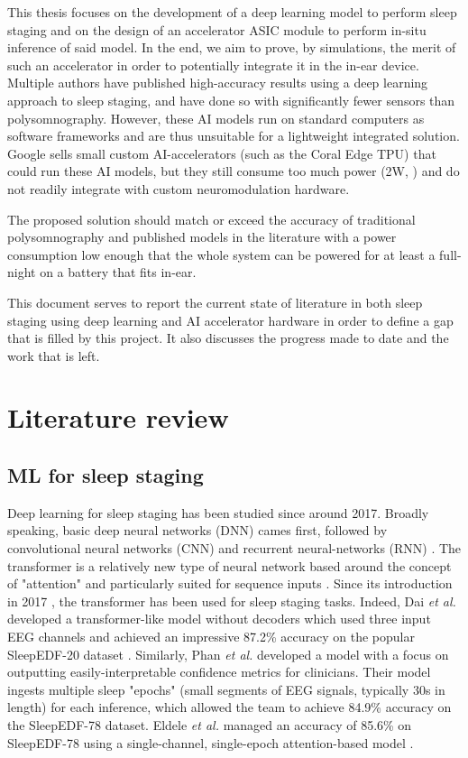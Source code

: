 \documentclass[12pt]{article}
\begin{document}
    This thesis focuses on the development of a deep learning model to perform sleep staging and on the design of an accelerator ASIC module to perform in-situ inference of said model. In the end, we aim to prove, by simulations, the merit of such an accelerator in order to potentially integrate it in the in-ear device.
    Multiple authors \cite{dutt2023sleepxai, fu2021deep, eldele2021attention} have published high-accuracy results using a deep learning approach to sleep staging, and have done so with significantly fewer sensors than polysomnography. However, these AI models run on standard computers as software frameworks and are
    thus unsuitable for a lightweight integrated solution. Google sells small custom AI-accelerators (such as the Coral Edge TPU) that could run these AI models, but they still consume too much power (2W, \cite{coral_datasheet}) and do not readily integrate with custom neuromodulation hardware.

    The proposed solution should match or exceed the accuracy of traditional polysomnography and published models in the literature with a power consumption low enough that the whole system can be powered for at least a full-night on a battery that fits in-ear.

    This document serves to report the current state of literature in both sleep staging using deep learning and AI accelerator hardware in order to define a gap that is filled by this project. It also discusses the progress made to date and the work that is left.

    \section{Literature review}
    \subsection{ML for sleep staging}
    Deep learning for sleep staging has been studied since around 2017. Broadly speaking, basic deep neural networks (DNN) cames first, followed by convolutional neural networks (CNN) and recurrent neural-networks (RNN) \cite{phan2022sleeptransformer}.
    The transformer is a relatively new type of neural network based around the concept of "attention" and particularly suited for sequence inputs \cite{han2022survey}. Since its introduction in 2017 \cite{vaswani2017attention}, the transformer has been used for sleep staging tasks. Indeed, Dai \textit{et al.} developed a transformer-like
    model without decoders which used three input EEG channels and achieved an impressive 87.2\% accuracy on the popular SleepEDF-20 dataset \cite{dai2023multichannelsleepnet}. Similarly, Phan \textit{et al.} developed a model with a focus on outputting easily-interpretable confidence metrics for clinicians. Their model ingests multiple
    sleep "epochs" (small segments of EEG signals, typically 30s in length) for each inference, which allowed the team to achieve 84.9\% accuracy on the SleepEDF-78 dataset. Eldele \textit{et al.} managed an accuracy of 85.6\% on SleepEDF-78 using a single-channel, single-epoch attention-based model \cite{eldele2021attention}.
\end{document}
